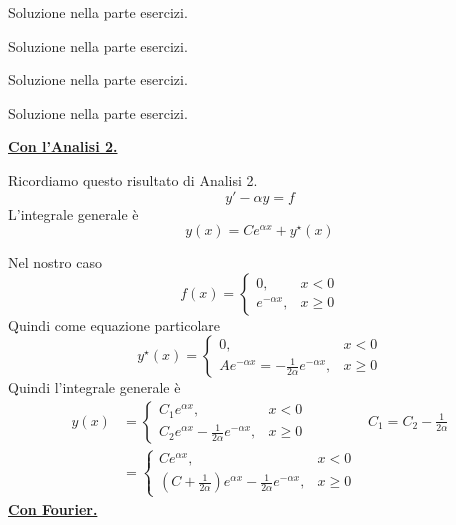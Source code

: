 Soluzione nella parte esercizi.

\Soluzione

Soluzione nella parte esercizi.

\Soluzione

Soluzione nella parte esercizi.

\Soluzione

Soluzione nella parte esercizi.

\Soluzione

\underline{\textbf{Con l'Analisi 2.}}
\begin{thm}
Ricordiamo questo risultato di Analisi 2.
\begin{equation*}
y' - \alpha y = f
\end{equation*}
L'integrale generale è
\begin{equation*}
y(x) = Ce^{\alpha x} + y^{\star}(x)
\end{equation*}
\end{thm}
Nel nostro caso
\begin{equation*}
f(x) =
\begin{cases}
0, & x < 0\\
e^{- \alpha x}, & x \geq 0
\end{cases}
\end{equation*}
Quindi come equazione particolare
\begin{equation*}
y^{\star}(x) =
\begin{cases}
0, & x < 0\\
Ae^{- \alpha x} = - \frac{1}{2\alpha} e^{- \alpha x}, & x \geq 0
\end{cases}
\end{equation*}
Quindi l'integrale generale è
\begin{equation*}
\begin{aligned}
y(x) & =
\begin{cases}
C_{1} e^{\alpha x}, & x < 0\\
C_{2} e^{\alpha x} - \frac{1}{2\alpha} e^{- \alpha x}, & x \geq 0
\end{cases} & C_{1} = C_{2} - \frac{1}{2\alpha}\\
 & =
\begin{cases}
Ce^{\alpha x}, & x < 0\\
\left(C + \frac{1}{2\alpha}\right) e^{\alpha x} - \frac{1}{2\alpha} e^{- \alpha x}, & x \geq 0
\end{cases} &
\end{aligned}
\end{equation*}
\underline{\textbf{Con Fourier.}}


